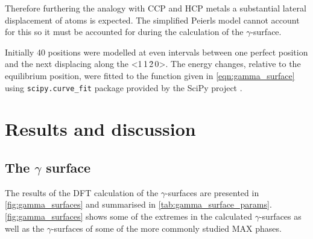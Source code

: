 Therefore furthering the analogy with CCP and HCP metals a substantial lateral displacement of atoms is expected. The simplified Peierls model cannot account for this so it must be accounted for during the calculation of the $\gamma$-surface.

Initially 40 positions were modelled at even intervals between one perfect position and the next displacing along the <1\,1\,\={2}\,0>. The energy changes, relative to the equilibrium position, were fitted to the function given in \autoref{eqn:gamma_surface} using \texttt{scipy.curve\_fit} package provided by the SciPy project \cite{SciPy2001}.





\section{Results and discussion}

\subsection{The \texorpdfstring{$\gamma$}{gamma} surface}
The results of the DFT calculation of the $\gamma$-surfaces are presented in \autoref{fig:gamma_surfaces} and summarised in \autoref{tab:gamma_surface_params}. \autoref{fig:gamma_surfaces} shows some of the extremes in the calculated $\gamma$-surfaces as well as the $\gamma$-surfaces of some of the more commonly studied MAX phases. 


